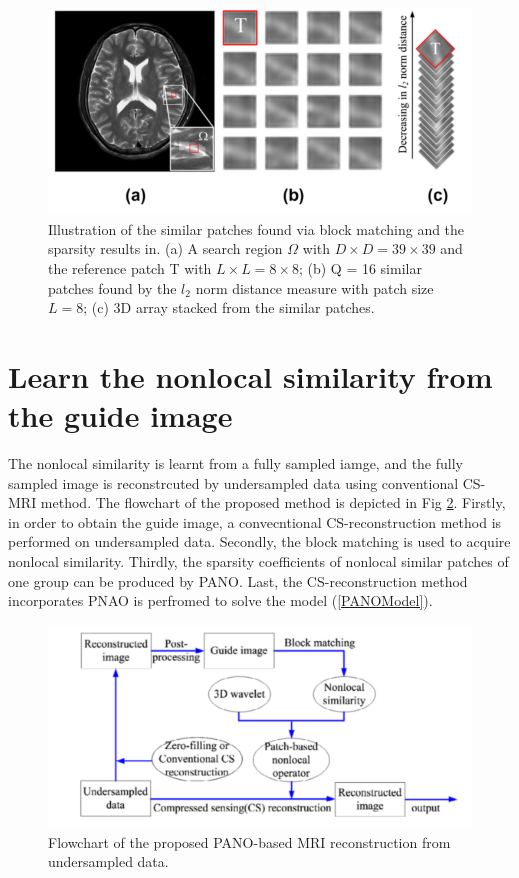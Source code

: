 \documentclass[UTF8]{article}
\begin{document}
\begin{figure}[ht]
	\centering
	\includegraphics[scale=1]{./image/Group.png}
	\caption{Illustration of the similar patches found via block matching and the sparsity results in. (a) A search region $\Omega$ with $D \times D = 3 9 \times 39$ and the reference patch T with
		$L \times L = 8 \times 8$; (b) Q = 16 similar patches found by the $l_2$ norm distance measure with patch size $L = 8$; (c) 3D array stacked from the similar patches.}
	\label{Group}
\end{figure}
\newpage
\section{Learn the nonlocal similarity from the guide image}
\par The nonlocal similarity is learnt from a fully sampled iamge, and the fully sampled image is reconstrcuted by undersampled data using conventional CS-MRI method. The flowchart of the proposed method  is depicted in Fig \ref{flowchart}.
Firstly, in order to obtain the guide image, a convecntional CS-reconstruction method is performed on undersampled data. Secondly, the block matching is used to acquire nonlocal similarity. Thirdly, the sparsity coefficients of nonlocal similar patches of one group can be produced by PANO. Last, the CS-reconstruction method incorporates PNAO is perfromed to solve the model (\ref{PANOModel}).
\begin{figure}[ht]
	\centering
	\includegraphics[scale=1]{./image/flowchart.png}
	\caption{ Flowchart  of  the  proposed  PANO-based  MRI  reconstruction  from  undersampled data.}
	\label{flowchart}
\end{figure}
\end{document}
